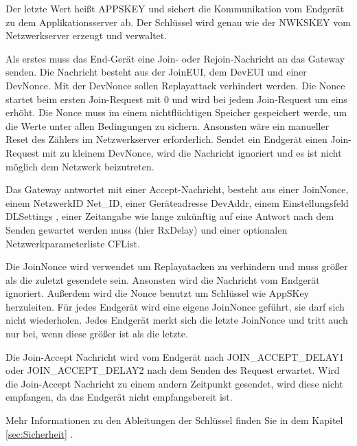 \documentclass[a4paper, 12pt]{article}
\begin{document}
                Der letzte Wert heißt APPSKEY und sichert die Kommunikation vom Endgerät zu dem Applikationsserver ab. 
                Der Schlüssel wird genau wie der NWKSKEY vom Netzwerkserver erzeugt und verwaltet.\cite[S.3]{LoRaSecur}

                Als erstes muss das End-Gerät eine Join- oder Rejoin-Nachricht an das Gateway senden. Die Nachricht besteht aus der 
                JoinEUI, dem DevEUI und einer DevNonce. Mit der DevNonce sollen Replayattack verhindert werden. Die
                Nonce startet beim ersten Join-Request mit 0 und wird bei jedem Join-Request um eins erhöht. 
                Die Nonce muss im einem nichtflüchtigen Speicher gespeichert werde, um die Werte unter allen Bedingungen 
                zu sichern. Ansonsten wäre ein manueller Reset des Zählers im Netzwerkserver erforderlich.
                Sendet ein Endgerät einen Join-Request mit zu kleinem DevNonce, wird die Nachricht ignoriert und es 
                ist nicht möglich dem Netzwerk 
                beizutreten.

                Das Gateway antwortet mit einer Accept-Nachricht, besteht aus einer JoinNonce, einem NetzwerkID Net\_ID, einer Geräteadresse DevAddr,
                einem Einstellungsfeld DLSettings , einer Zeitangabe wie lange zukünftig auf eine Antwort nach dem
                Senden gewartet werden muss (hier RxDelay) und einer optionalen Netzwerkparameterliste CFList.

                Die JoinNonce wird verwendet um Replayatacken zu verhindern und muss größer als die zuletzt 
                gesendete sein. Ansonsten wird die Nachricht vom Endgerät ignoriert. Außerdem wird die Nonce benutzt 
                um Schlüssel wie 
                AppSKey herzuleiten. Für jedes Endgerät wird eine eigene JoinNonce geführt, sie darf sich nicht 
                wiederholen. Jedes Endgerät merkt sich die letzte JoinNonce und tritt auch nur bei, wenn diese größer 
                ist als die letzte.

                Die Join-Accept Nachricht wird vom Endgerät nach JOIN\_ACCEPT\_DELAY1 oder JOIN\_ACCEPT\_DELAY2 nach 
                dem Senden des Request erwartet. Wird die Join-Accept Nachricht zu einem andern Zeitpunkt gesendet,
                wird diese nicht empfangen, da das Endgerät nicht empfangsbereit ist.

                Mehr Informationen zu den Ableitungen der Schlüssel finden Sie in dem Kapitel \ref{sec:Sicherheit} .
\end{document}

